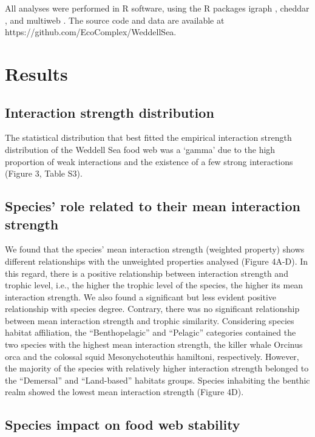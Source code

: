 \documentclass[gc, manuscript]{copernicus}
\begin{document}
All analyses were performed in R software, using the R packages igraph
\citep{Csardi2005}, cheddar \citep{Hudson2013}, and multiweb
\citep{Saravia2019}. The source code and data are available at
https://github.com/EcoComplex/WeddellSea.

\section{Results}

\subsection{Interaction strength distribution}

The statistical distribution that best fitted the empirical interaction
strength distribution of the Weddell Sea food web was a `gamma' due to
the high proportion of weak interactions and the existence of a few
strong interactions (Figure 3, Table S3).

\subsection{Species' role related to their mean interaction strength}

We found that the species' mean interaction strength (weighted property)
shows different relationships with the unweighted properties analysed
(Figure 4A-D). In this regard, there is a positive relationship between
interaction strength and trophic level, i.e., the higher the trophic
level of the species, the higher its mean interaction strength. We also
found a significant but less evident positive relationship with species
degree. Contrary, there was no significant relationship between mean
interaction strength and trophic similarity. Considering species habitat
affiliation, the ``Benthopelagic'' and ``Pelagic'' categories contained
the two species with the highest mean interaction strength, the killer
whale Orcinus orca and the colossal squid Mesonychoteuthis hamiltoni,
respectively. However, the majority of the species with relatively
higher interaction strength belonged to the ``Demersal'' and
``Land-based'' habitats groups. Species inhabiting the benthic realm
showed the lowest mean interaction strength (Figure 4D).

\subsection{Species impact on food web stability}
\end{document}
